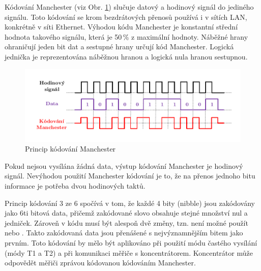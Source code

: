 Kódování Manchester (viz Obr. \ref{ObrazekManechester}) slučuje datový a hodinový signál do jediného signálu. Toto kódování se krom bezdrátových přenosů používá i v sítích LAN, konkrétně v síti Ethernet. Výhodou kódu Manchester je konstantní střední hodnota takového signálu, která je 50\,\% z maximální hodnoty. Náběžné hrany ohraničují jeden bit dat a sestupné hrany určují kód Manchester. Logická jednička je reprezentována náběžnou hranou a logická nula hranou sestupnou. 

				\begin{figure}[!ht]
				\vspace{-20pt}
 \begin{center}
    \includegraphics[scale=1.0]{obrazky/wmbus_manchester}
  \end{center}
	\vspace{-40pt}
  \caption{Princip kódování Manchester}
	\label{ObrazekManechester}
	\vspace{-10pt}
\end{figure}

Pokud nejsou vysílána žádná data, výstup kódování Manchester je hodinový signál. Nevýhodou použití Manchester kódování je to, že na přenos jednoho bitu informace je potřeba dvou hodinových taktů.

Princip kódování 3 ze 6 spočívá v tom, že každé 4 bity (nibble) jsou zakódovány jako 6ti bitová data, přičemž zakódované slovo obsahuje stejné množství nul a jedniček. Zároveň v kódu musí být alespoň dvě změny, tzn. není možné použít  nebo . Takto zakódovaná data jsou přenášené s nejvýznamnějším bitem jako prvním. Toto kódování by mělo být aplikováno při použití módu častého vysílání (módy T1 a T2) a při komunikaci měřiče s koncentrátorem. Koncentrátor může odpovědět měřiči zprávou kódovanou kódováním Manchester.


